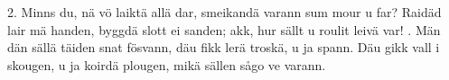 \setlength{\columnsep}{0.2cm}
\begin{multicols}{2}
2.  Minns du, nä vö laiktä allä dar,
    smeikandä varann sum mour u far?
    Raidäd lair mä handen,
    byggdä slott ei sanden;
    akk, hur sällt u roulit leivä var!
\vfill{}.  Män dän sällä täiden snat fösvann,
    däu fikk lerä troskä, u ja spann.
    Däu gikk vall i skougen,
    u ja koirdä plougen,
    mikä sällen sågo ve varann.
\end{multicols}
